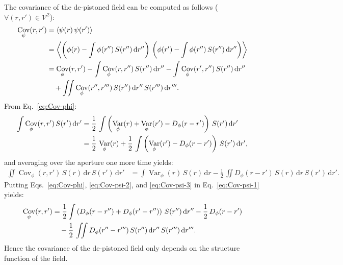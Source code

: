 \documentclass{article}
\DeclareMathOperator{\Var}{Var}
\DeclareMathOperator{\Cov}{Cov}
\begin{document}
The covariance of the de-pistoned field can be computed as follows
($\forall (r,r') \in \mathcal{V}^{2}$):
\begin{align}
  \Cov_{\psi}(r,r')
  &= \langle\psi(r)\,\psi(r')\rangle \notag \\
  &= \left\langle\left(\phi(r) - \int \phi(r'')\,S(r'')\,\mathrm{d}r''\right)\,
    \left(\phi(r') - \int \phi(r'')\,S(r'')\,\mathrm{d}r''\right)\right\rangle \notag \\
  &= \Cov_{\phi}(r,r')
    - \int \Cov_{\phi}(r,r'')\,S(r'')\,\mathrm{d}r''
    - \int \Cov_{\phi}(r',r'')\,S(r'')\,\mathrm{d}r'' \notag\\
  &\quad + \iint \Cov_{\phi}(r'',r''')\,S(r'')\,\mathrm{d}r''\,S(r''')\,\mathrm{d}r'''.
    \label{eq:Cov-psi-1}
\end{align}
From Eq.~\eqref{eq:Cov-phi}:
\begin{align}
  \int \Cov_{\phi}(r,r')\,S(r')\,\mathrm{d}r'
  &= \frac{1}{2}\,\int \left(
    \Var_{\phi}(r) + \Var_{\phi}(r') - D_{\phi}(r - r')
    \right)\,S(r')\,\mathrm{d}r'\notag\\
  &= \frac{1}{2}\,\Var_{\phi}(r)
    + \frac{1}{2}\,\int \left(
    \Var_{\phi}(r') - D_{\phi}(r - r')\right)\,S(r')\,\mathrm{d}r',
    \label{eq:Cov-psi-2}
\end{align}
and averaging over the aperture one more time yields:
\begin{align}
  \iint \Cov_{\phi}(r,r')\,S(r)\,\mathrm{d}r\,S(r')\,\mathrm{d}r'
  &= \int \Var_{\phi}(r)\,S(r)\,\mathrm{d}r
  - \frac{1}{2}\,\iint D_{\phi}(r - r')\,S(r)\,\mathrm{d}r\,S(r')\,\mathrm{d}r'.
    \label{eq:Cov-psi-3}
\end{align}
Putting Eqs.~\eqref{eq:Cov-phi}, \eqref{eq:Cov-psi-2}, and \eqref{eq:Cov-psi-3}
in Eq.~\eqref{eq:Cov-psi-1} yields:
\begin{align}
  \Cov_{\psi}(r,r')
  &= \frac{1}{2} \int \left(D_{\phi}(r - r'') + D_{\phi}(r' - r'')\right)\,S(r'')\,\mathrm{d}r''
    - \frac{1}{2} \, D_{\phi}(r - r') \notag\\
  &\quad - \frac{1}{2}\,\iint D_{\phi}(r'' - r''')\,S(r'')\,\mathrm{d}r''\,S(r''')\,\mathrm{d}r'''.
    \label{eq:Cov-psi-4}
\end{align}
Hence the covariance of the de-pistoned field only depends on the structure
function of the field.
\end{document}
